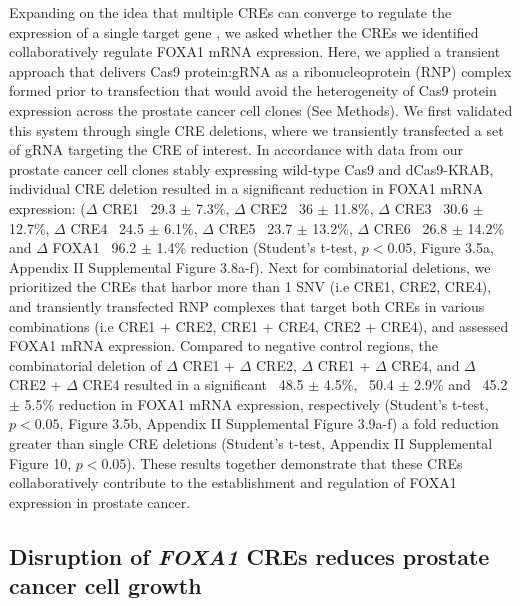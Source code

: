 Expanding on the idea that multiple CREs can converge to regulate the expression of a single target gene \cite{sallariConvergenceDispersedRegulatory2016,baileyNoncodingSomaticInherited2016,pennacchioEnhancersFiveEssential2013}, we asked whether the CREs we identified collaboratively regulate FOXA1 mRNA expression.
Here, we applied a transient approach that delivers Cas9 protein:gRNA as a ribonucleoprotein (RNP) complex formed prior to transfection that would avoid the heterogeneity of Cas9 protein expression across the prostate cancer cell clones (See Methods).
We first validated this system through single CRE deletions, where we transiently transfected a set of gRNA targeting the CRE of interest.
In accordance with data from our prostate cancer cell clones stably expressing wild-type Cas9 and dCas9-KRAB, individual CRE deletion resulted in a significant reduction in FOXA1 mRNA expression: ($\Delta$ CRE1 ~29.3 $\pm$ 7.3\%, $\Delta$ CRE2 ~36 $\pm$ 11.8\%, $\Delta$ CRE3 ~30.6 $\pm$ 12.7\%, $\Delta$ CRE4 ~24.5 $\pm$ 6.1\%, $\Delta$ CRE5 ~23.7 $\pm$ 13.2\%, $\Delta$ CRE6 ~26.8 $\pm$ 14.2\% and $\Delta$ FOXA1 ~96.2 $\pm$ 1.4\% reduction (Student’s t-test, $p<0.05$, Figure 3.5a, Appendix II Supplemental Figure 3.8a-f).
Next for combinatorial deletions, we prioritized the CREs that harbor more than 1 SNV (i.e CRE1, CRE2, CRE4), and transiently transfected RNP complexes that target both CREs in various combinations (i.e CRE1 + CRE2, CRE1 + CRE4, CRE2 + CRE4), and assessed FOXA1 mRNA expression.
Compared to negative control regions, the combinatorial deletion of $\Delta$ CRE1 + $\Delta$ CRE2, $\Delta$ CRE1 + $\Delta$ CRE4, and $\Delta$ CRE2 + $\Delta$ CRE4 resulted in a significant ~48.5 $\pm$ 4.5\%, ~50.4 $\pm$ 2.9\% and ~45.2 $\pm$ 5.5\% reduction in FOXA1 mRNA expression, respectively (Student’s t-test, $p<0.05$, Figure 3.5b, Appendix II Supplemental Figure 3.9a-f) a fold reduction greater than single CRE deletions (Student’s t-test, Appendix II Supplemental Figure 10, $p<0.05$).
These results together demonstrate that these CREs collaboratively contribute to the establishment and regulation of FOXA1 expression in prostate cancer.

\subsection{Disruption of \emph{FOXA1} CREs reduces prostate cancer cell growth}


